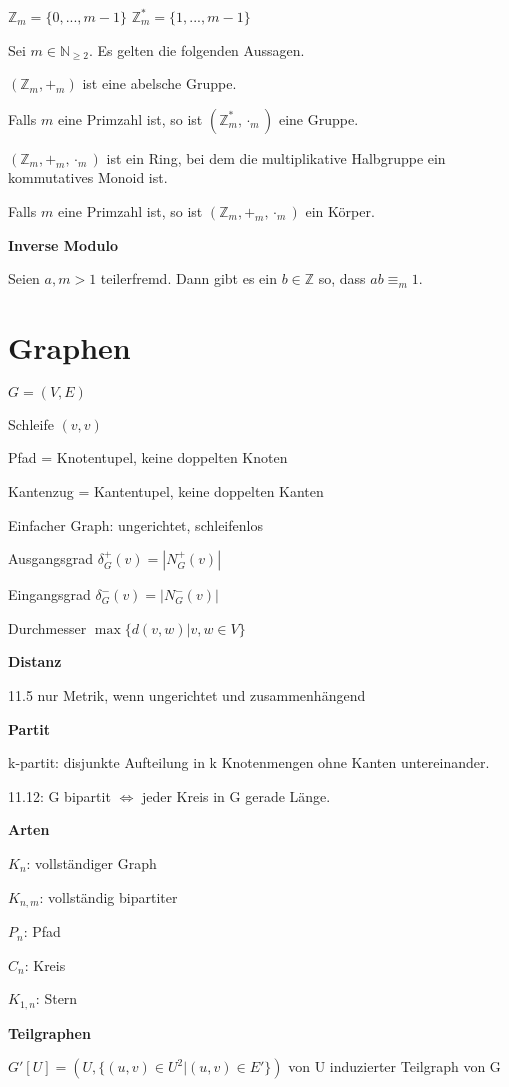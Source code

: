 \documentclass[a4paper,10pt]{article}
\newcommand{\natnum}{\mathbb{N}}
\newcommand{\integers}{\mathbb{Z}}
\begin{document}
\begin{multicols}{3}
$\integers_m = \{0,...,m-1\}$ $\integers_m^* = \{1,...,m-1\}$

Sei $m \in \natnum_{\geq 2}$. Es gelten die folgenden Aussagen.

$(\integers_m,+_m)$ ist eine abelsche Gruppe.

Falls $m$ eine Primzahl ist, so ist $(\integers_m^*,\cdot_m)$ eine Gruppe.

$(\integers_m,+_m,\cdot_m)$ ist ein Ring, bei dem die multiplikative Halbgruppe ein kommutatives Monoid ist.

Falls $m$ eine Primzahl ist, so ist $(\integers_m,+_m,\cdot_m)$ ein Körper.

\textbf{Inverse Modulo}

Seien $a,m > 1$ teilerfremd. Dann gibt es ein $b \in \integers$ so, dass $ab \equiv_m 1$. 

\section{Graphen}

$G=(V,E)$

Schleife $(v,v)$

Pfad = Knotentupel, keine doppelten Knoten

Kantenzug = Kantentupel, keine doppelten Kanten

Einfacher Graph: ungerichtet, schleifenlos

Ausgangsgrad $\delta_G^+(v) = |N_G^+(v)|$

Eingangsgrad $\delta_G^-(v) = |N_G^-(v)|$

Durchmesser $\max \{d(v,w) | v,w \in V\}$

\textbf{Distanz}

11.5 nur Metrik, wenn ungerichtet und zusammenhängend

\textbf{Partit}

k-partit: disjunkte Aufteilung in k Knotenmengen ohne Kanten untereinander.

11.12: G bipartit $\iff$ jeder Kreis in G gerade Länge.

\textbf{Arten}

$K_n$: vollständiger Graph

$K_{n,m}$: vollständig bipartiter

$P_n$: Pfad

$C_n$: Kreis

$K_{1,n}$: Stern

\textbf{Teilgraphen}

$G'[U] = (U, \{(u,v) \in U^2 | (u,v) \in E'\})$ von U induzierter Teilgraph von G


\end{multicols}
\end{document}

